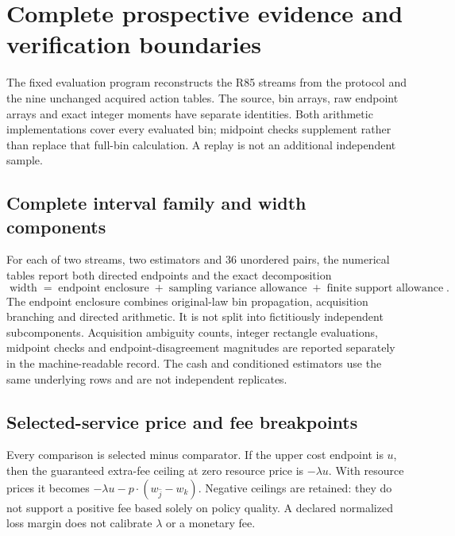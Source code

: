 \section{Complete prospective evidence and verification boundaries}\label{app:evidence86}
The fixed evaluation program reconstructs the R85 streams from the protocol and the nine unchanged acquired action tables. The source, bin arrays, raw endpoint arrays and exact integer moments have separate identities. Both arithmetic implementations cover every evaluated bin; midpoint checks supplement rather than replace that full-bin calculation. A replay is not an additional independent sample.

\subsection{Complete interval family and width components}
For each of two streams, two estimators and 36 unordered pairs, the numerical tables report both directed endpoints and the exact decomposition
\[
 \operatorname{width}=\operatorname{endpoint\ enclosure}
 +\operatorname{sampling\ variance\ allowance}
 +\operatorname{finite\ support\ allowance}.
\]
The endpoint enclosure combines original-law bin propagation, acquisition branching and directed arithmetic. It is not split into fictitiously independent subcomponents. Acquisition ambiguity counts, integer rectangle evaluations, midpoint checks and endpoint-disagreement magnitudes are reported separately in the machine-readable record. The cash and conditioned estimators use the same underlying rows and are not independent replicates.


\subsection{Selected-service price and fee breakpoints}
Every comparison is selected minus comparator. If the upper cost endpoint is $u$, then the guaranteed extra-fee ceiling at zero resource price is $-\lambda u$. With resource prices it becomes $-\lambda u-p\cdot(w_{\widehat j}-w_k)$. Negative ceilings are retained: they do not support a positive fee based solely on policy quality. A declared normalized loss margin does not calibrate $\lambda$ or a monetary fee.

